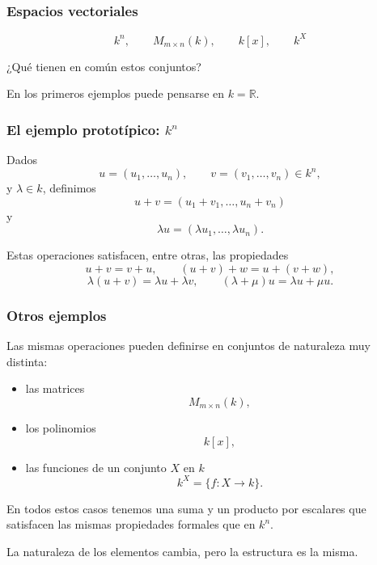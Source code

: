 

\begin{frame}
    \frametitle{Espacios vectoriales}

    \[
        k^n,
        \qquad
        M_{m\times n}(k),
        \qquad
        k[x],
        \qquad
        k^X
    \]

    \begin{center}
        \alert{¿Qué tienen en común estos conjuntos?}
    \end{center}

    \medskip

    \begin{alertblock}{}
        En los primeros ejemplos puede pensarse en \(k=\mathbb{R}\).
    \end{alertblock}
\end{frame}


\begin{frame}
    \frametitle{El ejemplo prototípico: \(k^n\)}

    Dados
    \[
        u=(u_1,\ldots,u_n),
        \qquad
        v=(v_1,\ldots,v_n)\in k^n,
    \]
    y \(\lambda\in k\), definimos
    \[
        u+v
        =
        (u_1+v_1,\ldots,u_n+v_n)
    \]
    y
    \[
        \lambda u
        =
        (\lambda u_1,\ldots,\lambda u_n).
    \]

    Estas operaciones satisfacen, entre otras, las propiedades
    \[
        u+v=v+u,
        \qquad
        (u+v)+w=u+(v+w),
    \]
    \[
        \lambda(u+v)=\lambda u+\lambda v,
        \qquad
        (\lambda+\mu)u=\lambda u+\mu u.
    \]
\end{frame}


\begin{frame}
    \frametitle{Otros ejemplos}

    Las mismas operaciones pueden definirse en conjuntos de naturaleza muy distinta:

    \begin{itemize}
        \item las matrices
        \[
            M_{m\times n}(k),
        \]

        \item los polinomios
        \[
            k[x],
        \]

        \item las funciones de un conjunto \(X\) en \(k\)
        \[
            k^X=\{f\colon X\longrightarrow k\}.
        \]
    \end{itemize}

    En todos estos casos tenemos una suma y un producto por escalares
    que satisfacen las mismas propiedades formales que en \(k^n\).

    \medskip

    \begin{center}
        \alert{La naturaleza de los elementos cambia, pero la estructura es la misma.}
    \end{center}
\end{frame}

